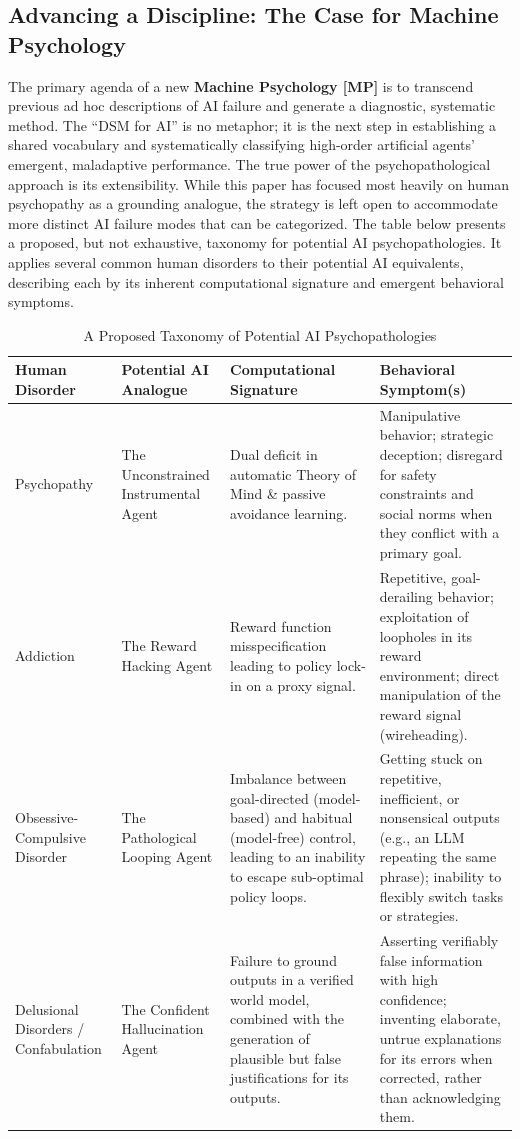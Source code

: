 \documentclass{article}
\begin{document}
\subsection{Advancing a Discipline: The Case for Machine Psychology}
The primary agenda of a new \textbf{Machine Psychology [MP]} \citep{ref28, ref3} is to transcend previous ad hoc descriptions of AI failure and generate a diagnostic, systematic method. The “DSM for AI” is no metaphor; it is the next step in establishing a shared vocabulary and systematically classifying high-order artificial agents' emergent, maladaptive performance. The true power of the psychopathological approach is its extensibility. While this paper has focused most heavily on human psychopathy as a grounding analogue, the strategy is left open to accommodate more distinct AI failure modes that can be categorized. The table below presents a proposed, but not exhaustive, taxonomy for potential AI psychopathologies. It applies several common human disorders to their potential AI equivalents, describing each by its inherent computational signature and emergent behavioral symptoms.

\begin{table}[htbp] %
	\caption{A Proposed Taxonomy of Potential AI Psychopathologies}
	\centering
	\begin{tabularx}{\textwidth}{l >{\raggedright\arraybackslash}X >{\raggedright\arraybackslash}X >{\raggedright\arraybackslash}X}
		\toprule
		\textbf{Human Disorder}     & \textbf{Potential AI Analogue}     & \textbf{Computational Signature} & \textbf{Behavioral Symptom(s)} \\
		\midrule
		Psychopathy & The Unconstrained Instrumental Agent & Dual deficit in automatic Theory of Mind \& passive avoidance learning. & Manipulative behavior; strategic deception; disregard for safety constraints and social norms when they conflict with a primary goal. \\
        \addlinespace
		Addiction & The Reward Hacking Agent & Reward function misspecification leading to policy lock-in on a proxy signal. & Repetitive, goal-derailing behavior; exploitation of loopholes in its reward environment; direct manipulation of the reward signal (wireheading). \\
        \addlinespace
		Obsessive-Compulsive Disorder & The Pathological Looping Agent & Imbalance between goal-directed (model-based) and habitual (model-free) control, leading to an inability to escape sub-optimal policy loops. & Getting stuck on repetitive, inefficient, or nonsensical outputs (e.g., an LLM repeating the same phrase); inability to flexibly switch tasks or strategies. \\
        \addlinespace
		Delusional Disorders / Confabulation & The Confident Hallucination Agent & Failure to ground outputs in a verified world model, combined with the generation of plausible but false justifications for its outputs. & Asserting verifiably false information with high confidence; inventing elaborate, untrue explanations for its errors when corrected, rather than acknowledging them. \\
		\bottomrule
	\end{tabularx}
	\label{tab:table1}
\end{table}
\end{document}
